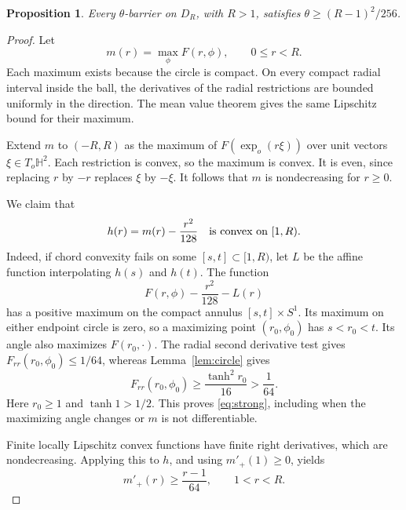 \documentclass[11pt]{article}
\newtheorem{proposition}[theorem]{Proposition}
\newcommand{\HH}{\mathbb H}
\begin{document}
\begin{proposition}\label{prop:lower}
Every \(\theta\)-barrier on \(D_R\), with \(R>1\), satisfies
\(\theta\geq(R-1)^2/256\).
\end{proposition}

\begin{proof}
Let
\[
 m(r)=\max_{\phi}F(r,\phi),\qquad 0\leq r<R.
\]
Each maximum exists because the circle is compact. On every compact
radial interval inside the ball, the derivatives of the radial
restrictions are bounded uniformly in the direction. The mean value
theorem gives the same Lipschitz bound for their maximum.

Extend \(m\) to \((-R,R)\) as the maximum of
\(F(\exp_o(r\xi))\) over unit vectors \(\xi\in T_o\HH^2\). Each restriction
is convex, so the maximum is convex. It is even, since replacing \(r\)
by \(-r\) replaces \(\xi\) by \(-\xi\). It follows that \(m\) is
nondecreasing for \(r\geq0\).

We claim that
\begin{equation}
 h(r)=m(r)-\frac{r^2}{128}
       \quad\hbox{is convex on }[1,R).\label{eq:strong}
\end{equation}
Indeed, if chord convexity fails on some \([s,t]\subset[1,R)\), let
\(L\) be the affine function interpolating \(h(s)\) and \(h(t)\).
The function
\[
 F(r,\phi)-\frac{r^2}{128}-L(r)
\]
has a positive maximum on the compact annulus \([s,t]\times S^1\).
Its maximum on either endpoint circle is zero, so a maximizing point
\((r_0,\phi_0)\) has \(s<r_0<t\). Its angle also maximizes
\(F(r_0,\cdot)\). The radial second derivative test gives
\(F_{rr}(r_0,\phi_0)\leq1/64\), whereas Lemma~\ref{lem:circle} gives
\[
 F_{rr}(r_0,\phi_0)\geq\frac{\tanh^2r_0}{16}>
 \frac1{64}.
\]
Here \(r_0\geq1\) and \(\tanh1>1/2\). This proves \eqref{eq:strong},
including when the maximizing angle changes or \(m\) is not
differentiable.

Finite locally Lipschitz convex functions have finite right derivatives,
which are nondecreasing. Applying this to \(h\), and using
\(m'_+(1)\geq0\), yields
\begin{equation}
 m'_+(r)\geq\frac{r-1}{64},\qquad 1<r<R.\label{eq:lower-slope}
\end{equation}


\end{proof}
\end{document}
